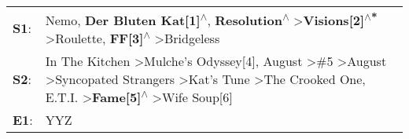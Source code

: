 \begin{supertabular}{p{0.03\textwidth}p{0.92\textwidth}}
 \textbf{S1}:  &                                                                                                                                                                                    Nemo\textsuperscript{}, \enspace \textbf{Der Bluten Kat[1]\textsuperscript{$\wedge$}}, \enspace \textbf{Resolution\textsuperscript{$\wedge$}} \textgreater \enspace \textbf{Visions[2]\textsuperscript{$\wedge$*}} \textgreater \enspace Roulette\textsuperscript{}, \enspace \textbf{FF[3]\textsuperscript{$\wedge$}} \textgreater \enspace Bridgeless\textsuperscript{}  \enspace  \\
 \textbf{S2}:  &  In The Kitchen\textsuperscript{} \textgreater \enspace Mulche's Odyssey[4]\textsuperscript{}, \enspace August\textsuperscript{} \textgreater \enspace \#5\textsuperscript{} \textgreater \enspace August\textsuperscript{} \textgreater \enspace Syncopated Strangers\textsuperscript{} \textgreater \enspace Kat's Tune\textsuperscript{} \textgreater \enspace The Crooked One\textsuperscript{}, \enspace E.T.I.\textsuperscript{} \textgreater \enspace \textbf{Fame[5]\textsuperscript{$\wedge$}} \textgreater \enspace Wife Soup[6]\textsuperscript{}  \enspace  \\
 \textbf{E1}:  &                                                                                                                                                                                                                                                                                                                                                                                                                                                                                                                                        YYZ\textsuperscript{}  \enspace  \\
\end{supertabular}
